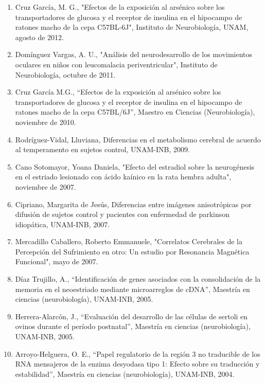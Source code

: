 \begin{enumerate}
\item Cruz García, M. G., "Efectos de la exposición al arsénico sobre los transportadores de glucosa y el receptor de 
insulina en el hipocampo de ratones macho de la cepa C57BL-6J", Instituto de Neurobiología, UNAM, agosto de 2012.

\item Domínguez Vargas, A. U., "Análisis del neurodesarrollo de los movimientos oculares en niños con leucomalacia 
periventricular", Instituto de Neurobiología, octubre de 2011.

\item Cruz García M.G., “Efectos de la exposición al arsénico sobre los transportadores de glucosa y el receptor de 
insulina 
en el hipocampo de ratones macho de la cepa C57BL/6J”, Maestro en Ciencias (Neurobiología), noviembre de 2010.

\item Rodríguez-Vidal, Lluviana, Diferencias en el metabolismo cerebral de acuerdo al temperamento en sujetos 
control, UNAM-INB, 2009.

\item Cano Sotomayor, Yoana Daniela, "Efecto del estradiol sobre la neurogénesis en el estriado lesionado con ácido kaínico 
en la rata hembra adulta", noviembre de 2007.

\item Cipriano, Margarita de Jesús, Diferencias entre imágenes anisotrópicas por difusión de sujetos control y pacientes 
con 
enfermedad de parkinson idiopática, UNAM-INB, 2007.

\item Mercadillo Caballero, Roberto Emmanuele, "Correlatos Cerebrales de la Percepción del Sufrimiento en otro: Un estudio 
por Resonancia Magnética Funcional", mayo de 2007.

\item Díaz Trujillo, A., “Identificación de genes asociados con la consolidación de la memoria en el neoestriado mediante 
microarreglos de cDNA”, Maestría en ciencias (neurobiología), UNAM-INB, 2005.

\item Herrera-Alarcón, J., “Evaluación del desarrollo de las células de sertoli en ovinos durante el período postnatal”, 
Maestría en ciencias (neurobiología), UNAM-INB, 2005.

\item Arroyo-Helguera, O. E., “Papel regulatorio de la región 3 no traducible de los RNA mensajeros de la enzima desyodasa 
tipo 1: Efecto sobre su traducción y estabilidad”, Maestría en ciencias (neurobiología), UNAM-INB, 2004.


\end{enumerate}
